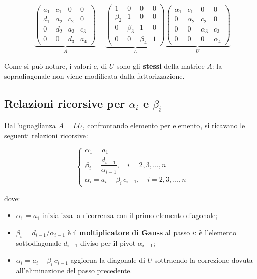 \documentclass[a4paper,12pt]{article}
\theoremstyle{definition}
\theoremstyle{remark}
\begin{document}
\[
  \underbrace{
    \begin{pmatrix}
      a_1  & c_1  & 0    & 0 \\
      d_1  & a_2  & c_2  & 0 \\
      0    & d_2  & a_3  & c_3 \\
      0    & 0    & d_3  & a_4
    \end{pmatrix}
  }_{A}
  =
  \underbrace{
    \begin{pmatrix}
      1       & 0       & 0  & 0 \\
      \beta_2 & 1       & 0  & 0 \\
      0       & \beta_3 & 1  & 0 \\
      0       & 0       & \beta_4 & 1
    \end{pmatrix}
  }_{L}
  \underbrace{
    \begin{pmatrix}
      \alpha_1 & c_1      & 0        & 0 \\
      0        & \alpha_2 & c_2      & 0 \\
      0        & 0        & \alpha_3 & c_3 \\
      0        & 0        & 0        & \alpha_4
    \end{pmatrix}
  }_{U}
\]

\noindent Come si può notare, i valori $c_i$ di $U$ sono gli \textbf{stessi}
della matrice $A$: la sopradiagonale non viene modificata dalla
fattorizzazione.

\subsection{Relazioni ricorsive per $\alpha_i$ e $\beta_i$}

Dall'uguaglianza $A = LU$, confrontando elemento per elemento, si ricavano
le seguenti relazioni ricorsive:

\begin{equation}
  \begin{cases}
    \alpha_1 = a_1 \\[6pt]
    \beta_i  = \dfrac{d_{i-1}}{\alpha_{i-1}}, \quad i = 2, 3, \ldots, n \\[8pt]
    \alpha_i = a_i - \beta_i\,c_{i-1}, \quad i = 2, 3, \ldots, n
  \end{cases}
  \label{eq:thomas-relazioni}
\end{equation}

\noindent dove:
\begin{itemize}
  \item $\alpha_1 = a_1$ inizializza la ricorrenza con il primo elemento
        diagonale;
  \item $\beta_i = d_{i-1}/\alpha_{i-1}$ è il \textbf{moltiplicatore di
        Gauss} al passo $i$: è l'elemento sottodiagonale $d_{i-1}$ diviso
        per il pivot $\alpha_{i-1}$;
  \item $\alpha_i = a_i - \beta_i\,c_{i-1}$ aggiorna la diagonale di $U$
        sottraendo la correzione dovuta all'eliminazione del passo precedente.
\end{itemize}
\end{document}
